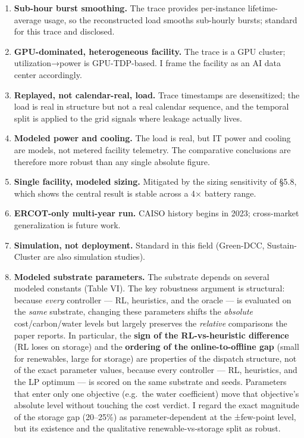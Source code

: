 \documentclass[
  11pt,
]{article}
\begin{document}
\begin{enumerate}
\def\labelenumi{\arabic{enumi}.}
\item
  \textbf{Sub-hour burst smoothing.} The trace provides per-instance
  lifetime-average usage, so the reconstructed load smooths sub-hourly
  bursts; standard for this trace and disclosed.
\item
  \textbf{GPU-dominated, heterogeneous facility.} The trace is a GPU
  cluster; utilization→power is GPU-TDP-based. I frame the facility as
  an AI data center accordingly.
\item
  \textbf{Replayed, not calendar-real, load.} Trace timestamps are
  desensitized; the load is real in structure but not a real calendar
  sequence, and the temporal split is applied to the grid signals where
  leakage actually lives.
\item
  \textbf{Modeled power and cooling.} The load is real, but IT power and
  cooling are models, not metered facility telemetry. The comparative
  conclusions are therefore more robust than any single absolute figure.
\item
  \textbf{Single facility, modeled sizing.} Mitigated by the sizing
  sensitivity of §5.8, which shows the central result is stable across a
  4× battery range.
\item
  \textbf{ERCOT-only multi-year run.} CAISO history begins in 2023;
  cross-market generalization is future work.
\item
  \textbf{Simulation, not deployment.} Standard in this field
  (Green-DCC, Sustain-Cluster are also simulation studies).
\item
  \textbf{Modeled substrate parameters.} The substrate depends on
  several modeled constants (Table VI). The key robustness argument is
  structural: because \emph{every} controller --- RL, heuristics, and
  the oracle --- is evaluated on the \emph{same} substrate, changing
  these parameters shifts the \emph{absolute} cost/carbon/water levels
  but largely preserves the \emph{relative} comparisons the paper
  reports. In particular, the \textbf{sign of the RL-vs-heuristic
  difference} (RL loses on storage) and the \textbf{ordering of the
  online-to-offline gap} (small for renewables, large for storage) are
  properties of the dispatch structure, not of the exact parameter
  values, because every controller --- RL, heuristics, and the LP
  optimum --- is scored on the same substrate and seeds. Parameters that
  enter only one objective (e.g.~the water coefficient) move that
  objective's absolute level without touching the cost verdict. I regard
  the exact magnitude of the storage gap (20--25\%) as
  parameter-dependent at the ±few-point level, but its existence and the
  qualitative renewable-vs-storage split as robust.


\end{enumerate}
\end{document}
